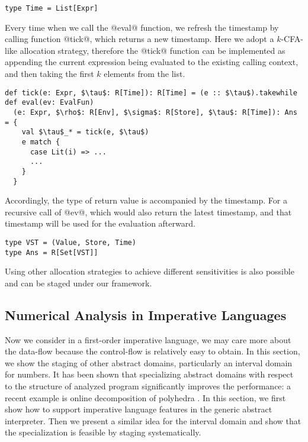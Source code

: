 \begin{lstlisting}
type Time = List[Expr]
\end{lstlisting}

Every time when we call the @eval@ function, we refresh the timestamp by calling
function @tick@, which returns a new timestamp. Here we adopt a $k$-CFA-like
allocation strategy, therefore the @tick@ function can be implemented as
appending the current expression being evaluated to the existing calling
context, and then taking the first $k$ elements from the list.

\begin{lstlisting}
def tick(e: Expr, $\tau$: R[Time]): R[Time] = (e :: $\tau$).takewhile
def eval(ev: EvalFun)
  (e: Expr, $\rho$: R[Env], $\sigma$: R[Store], $\tau$: R[Time]): Ans = {
    val $\tau$_* = tick(e, $\tau$)
    e match {
      case Lit(i) => ...
      ...
    }
  }
\end{lstlisting}

Accordingly, the type of return value is accompanied by the timestamp. For a
recursive call of @ev@, which would also return the latest timestamp, and that
timestamp will be used for the evaluation afterward.

\begin{lstlisting}
type VST = (Value, Store, Time)
type Ans = R[Set[VST]]
\end{lstlisting}

Using other allocation strategies to achieve different sensitivities is also
possible \cite{DBLP:conf/icfp/Gilray0M16} and can be staged under our framework.
 



\subsection{Numerical Analysis in Imperative Languages} \label{cases_imp}

Now we consider in a first-order imperative language, we may care more about the
data-flow because the control-flow is relatively easy to obtain. In this
section, we show the staging of other abstract domains, particularly an interval
domain for numbers. It has been shown that specializing abstract domains with
respect to the structure of analyzed program significantly improves the
performance: a recent example is online decomposition of polyhedra
\cite{DBLP:conf/popl/SinghPV17, Singh:2017:PCD:3177123.3158143}. In this
section, we first show how to support imperative language features in the
generic abstract interpreter. Then we present a similar idea for the interval
domain and show that the specialization is feasible by staging systematically.

